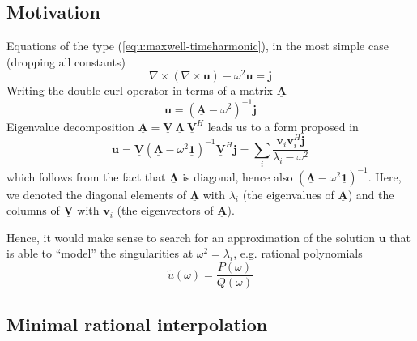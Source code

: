 \documentclass[11pt, a4paper]{article}
\begin{document}
\subsection{Motivation}
\label{subsec:motivation}

Equations of the type (\ref{equ:maxwell-timeharmonic}), in the most simple case (dropping
all constants)
\begin{equation}
    \nabla \times (\nabla \times \mathbf{u}) - \omega^2 \mathbf{u} = \mathbf{j}
\end{equation}
Writing the double-curl operator in terms of a matrix $\mathbf{\underline{A}}$
\begin{equation}
    \mathbf{u} = (\mathbf{\underline{A}} - \omega^2)^{-1} \mathbf{j}
\end{equation}
Eigenvalue decomposition $\mathbf{\underline{A}} = \mathbf{\underline{V}} ~ \boldsymbol{\underline{\Lambda}} ~ \mathbf{\underline{V}}^H$
leads us to a form proposed in \cite{helmholtz-motivation}
\begin{equation}
    \mathbf{u} = \mathbf{\underline{V}} (\boldsymbol{\underline{\Lambda}} - \omega^2 \boldsymbol{\underline{1}})^{-1} \mathbf{\underline{V}}^H \mathbf{j} 
    = \sum_i \frac{\mathbf{v}_i \mathbf{v}_i^H \mathbf{j}}{\lambda_i - \omega^2} \label{equ:motivation}
\end{equation}
which follows from the fact that $\boldsymbol{\underline{\Lambda}}$ is diagonal,
hence also $(\boldsymbol{\underline{\Lambda}} - \omega^2 \boldsymbol{\underline{1}})^{-1}$.
Here, we denoted the diagonal elements of $\boldsymbol{\underline{\Lambda}}$ with 
$\lambda_i$ (the eigenvalues of $\mathbf{\underline{A}}$) and the columns of
$\mathbf{\underline{V}}$ with $\mathbf{v}_i$ (the eigenvectors of $\mathbf{\underline{A}}$).

Hence, it would make sense to search for an approximation of the solution $\mathbf{u}$
that is able to \enquote{model} the singularities at $\omega^2 = \lambda_i$, e.g.
rational polynomials
\begin{equation}
    \tilde{u}(\omega) = \frac{P(\omega)}{Q(\omega)}
\end{equation}

\subsection{Minimal rational interpolation}
\label{subsec:MRI}
\end{document}
